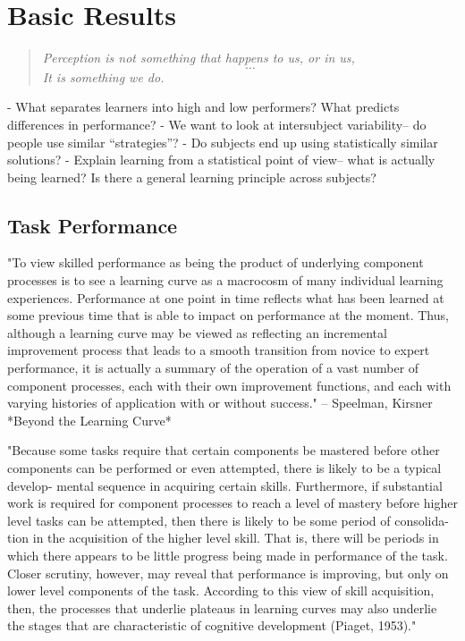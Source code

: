 \documentclass[../main.tex]{subfiles}
\begin{document}
\chapter{Basic Results}\label{chap:basic_results}

\begin{quote}
    \emph{Perception is not something that happens to us, or in us, \[\ldots\] It is something we do.} \\ 
\end{quote}

 
- What separates learners into high and low performers? What predicts differences in performance?
- We want to look at intersubject variability– do people use similar “strategies”?
- Do subjects end up using statistically similar solutions?
- Explain learning from a statistical point of view– what is actually being learned? Is there a general learning principle across subjects?

\section{Task Performance}

"To view skilled performance as being the product of underlying component
processes is to see a learning curve as a macrocosm of many individual
learning experiences. Performance at one point in time reflects what has been
learned at some previous time that is able to impact on performance at the
moment. Thus, although a learning curve may be viewed as reflecting an
incremental improvement process that leads to a smooth transition from
novice to expert performance, it is actually a summary of the operation of a
vast number of component processes, each with their own improvement
functions, and each with varying histories of application with or without
success."
-- Speelman, Kirsner *Beyond the Learning Curve*

"Because some
tasks require that certain components be mastered before other components
can be performed or even attempted, there is likely to be a typical develop-
mental sequence in acquiring certain skills. Furthermore, if substantial work is
required for component processes to reach a level of mastery before higher
level tasks can be attempted, then there is likely to be some period of consolida-
tion in the acquisition of the higher level skill. That is, there will be periods in
which there appears to be little progress being made in performance of the
task. Closer scrutiny, however, may reveal that performance is improving, but
only on lower level components of the task. According to this view of skill
acquisition, then, the processes that underlie plateaus in learning curves may
also underlie the stages that are characteristic of cognitive development
(Piaget, 1953)."
\end{document}

